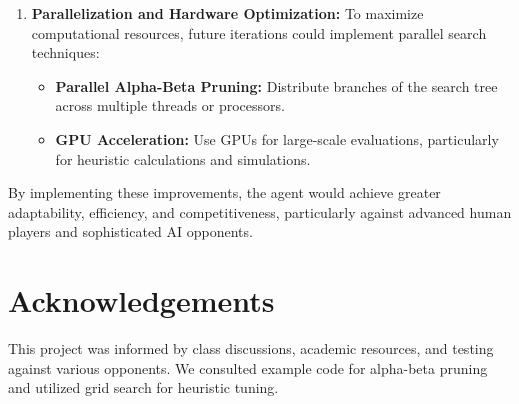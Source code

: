 \documentclass[11pt]{article}
\begin{document}
\begin{enumerate}
    \item \textbf{Parallelization and Hardware Optimization:}
    To maximize computational resources, future iterations could implement parallel search techniques:
    \begin{itemize}
        \item \textbf{Parallel Alpha-Beta Pruning:} Distribute branches of the search tree across multiple threads or processors.
        \item \textbf{GPU Acceleration:} Use GPUs for large-scale evaluations, particularly for heuristic calculations and simulations.
    \end{itemize}


\end{enumerate}

By implementing these improvements, the agent would achieve greater adaptability, efficiency, and competitiveness, particularly against advanced human players and sophisticated AI opponents.


\section*{Acknowledgements}
This project was informed by class discussions, academic resources, and testing against various opponents. We consulted example code for alpha-beta pruning and utilized grid search for heuristic tuning.
\end{document}
